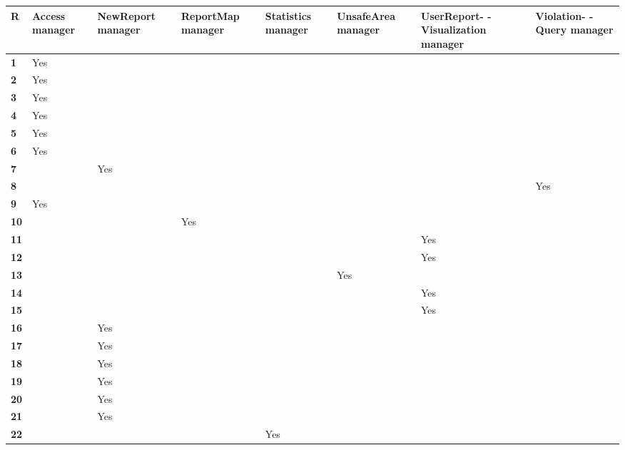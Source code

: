 \documentclass[../RASD.tex]{subfiles}
\begin{document}
    \newpage
        \begin{longtable}{| p{.02\linewidth} | p{.10\linewidth} | p{.14\linewidth} | p{.14\linewidth} | p{.105\linewidth} | p{.14\linewidth} |
        p{.17\linewidth} | p{.12\linewidth} |}
            \hline
            \textbf{R} & \textbf{Access manager} & \textbf{NewReport manager} & \textbf{ReportMap manager} & \textbf{Statistics manager} &
            \textbf{UnsafeArea manager} & \textbf{UserReport- -Visualization manager} & \textbf{Violation- -Query manager}\\ \hline
            \textbf{1} & Yes & & & & & & \\ \hline
            \textbf{2} & Yes & & & & & & \\ \hline
            \textbf{3} & Yes & & & & & & \\ \hline
            \textbf{4} & Yes & & & & & & \\ \hline
            \textbf{5} & Yes & & & & & & \\ \hline
            \textbf{6} & Yes & & & & & & \\ \hline
            \textbf{7} & & Yes & & & & & \\ \hline
            \textbf{8} & & & & & & & Yes\\ \hline
            \textbf{9} & Yes & & & & & & \\ \hline
            \textbf{10} & & & Yes & & & & \\ \hline
            \textbf{11} & & & & & & Yes & \\ \hline
            \textbf{12} & & & & & & Yes & \\ \hline
            \textbf{13} & & & & & Yes & & \\ \hline
            \textbf{14} & & & & & & Yes & \\ \hline
            \textbf{15} & & & & & & Yes & \\ \hline
            \textbf{16} & & Yes & & & & & \\ \hline
            \textbf{17} & & Yes & & & & & \\ \hline
            \textbf{18} & & Yes & & & & & \\ \hline
            \textbf{19} & & Yes & & & & & \\ \hline
            \textbf{20} & & Yes & & & & & \\ \hline
            \textbf{21} & & Yes & & & & & \\ \hline
            \textbf{22} & & & & Yes & & & \\ \hline

\end{longtable}
\end{document}
